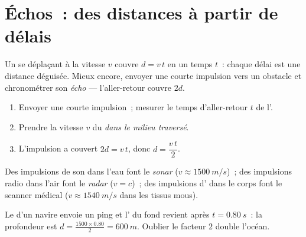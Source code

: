\section{Échos~: des distances à partir de délais}

Un  se déplaçant à la vitesse $v$ couvre $d = v\,t$ en
un temps $t$~: chaque délai est une distance déguisée. Mieux encore,
envoyer une courte impulsion vers un obstacle et chronométrer son
\emph{écho} --- l'aller-retour couvre $2d$.

\begin{method}\label{met:g10:signals-and-waves:echo}
\begin{enumerate}
  \item Envoyer une courte impulsion~; mesurer le temps d'aller-retour
        $t$ de l'.
  \item Prendre la vitesse $v$ du  \emph{dans le milieu
        traversé}.
  \item L'impulsion a couvert $2d = v\,t$, donc $d = \dfrac{v\,t}{2}$.
\end{enumerate}
Des impulsions de son dans l'eau font le
\emph{sonar} ($v \approx \qty{1500}{m/s}$)~; des
impulsions radio dans l'air font le \emph{radar}
($v = c$)~; des impulsions d' dans le corps font
le scanner médical ($v \approx \qty{1540}{m/s}$ dans les tissus mous).
\end{method}

\begin{example}[Sonar]\label{ex:g10:signals-and-waves:sonar}
Le  d'un navire envoie un ping et l'
du fond revient après $t = \qty{0.80}{s}$~: la profondeur est
$d = \frac{1500 \times 0.80}{2} = \qty{600}{m}$. Oublier le facteur $2$
double l'océan.
\end{example}

